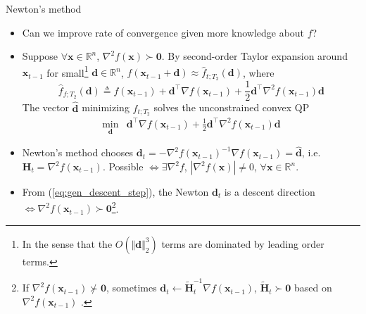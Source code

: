 \documentclass{beamer}
\numberwithin{equation}{section}
\newcommand{\aref}[1]{\alert{\ref{#1}}}
\begin{document}
\begin{frame}{Newton's method}
    \begin{itemize}
        \item
        Can we improve rate of convergence given more knowledge about $ f $?

        \item
        Suppose $ \forall \mathbf{x} \in \mathbb{R}^n $,
        $ \nabla^2f(\mathbf{x}) \succ \mathbf{0} $. By second-order Taylor
        expansion around $ \mathbf{x}_{t - 1} $ for small\footnote{
            In the sense that the $ O(\Vert\mathbf{d}\Vert_2^3) $ terms are
            dominated by leading order terms.        
        } $ \mathbf{d} \in \mathbb{R}^n $, $ f(\mathbf{x}_{t - 1} +
        \mathbf{d}) \approx \hat{f}_{t; T_2}(\mathbf{d}) $, where
        \begin{equation*}
            \hat{f}_{f; T_2}(\mathbf{d}) \triangleq f(\mathbf{x}_{t - 1}) +
                \mathbf{d}^\top\nabla f(\mathbf{x}_{t - 1}) +
                \frac{1}{2}\mathbf{d}^\top
                \nabla^2f(\mathbf{x}_{t - 1})\mathbf{d}
        \end{equation*}
        The vector $ \hat{\mathbf{d}} $ minimizing $ \hat{f}_{t; T_2} $ solves
        the unconstrained convex QP
        \begin{equation} \label{eq:newton_descent_opt}
            \begin{array}{ll}
                \displaystyle\min_{\mathbf{d}} &
                    \mathbf{d}^\top\nabla f(\mathbf{x}_{t - 1}) +
                    \frac{1}{2}\mathbf{d}^\top
                    \nabla^2f(\mathbf{x}_{t - 1})\mathbf{d}
            \end{array}
        \end{equation}

        \item
        Newton's method chooses $ \mathbf{d}_t =
        -\nabla^2f(\mathbf{x}_{t - 1})^{-1}\nabla f(\mathbf{x}_{t - 1}) =
        \hat{\mathbf{d}} $, i.e. $ \mathbf{H}_t =
        \nabla^2f(\mathbf{x}_{t - 1}) $. Possible $ \Leftrightarrow
        \exists\nabla^2f $, $ \left|\nabla^2f(\mathbf{x})\right| \ne 0 $,
        $ \forall \mathbf{x} \in \mathbb{R}^n $.


        \item
        From (\aref{eq:gen_descent_step}), the Newton $ \mathbf{d}_t $ is a
        descent direction $ \Leftrightarrow \nabla^2f(\mathbf{x}_{t - 1})
        \succ \mathbf{0} $\footnote{
            If $ \nabla^2 f(\mathbf{x}_{t - 1}) \not\succ \mathbf{0} $,
            sometimes $ \mathbf{d}_t \leftarrow \tilde{\mathbf{H}}_t^{-1}
            \nabla f(\mathbf{x}_{t - 1}) $, $ \tilde{\mathbf{H}}_t \succ
            \mathbf{0} $ based on $ \nabla^2f(\mathbf{x}_{t - 1}) $
            \cite{nocedal_opt}.
        }.
    \end{itemize}

    \bigskip
\end{frame}
\end{document}

